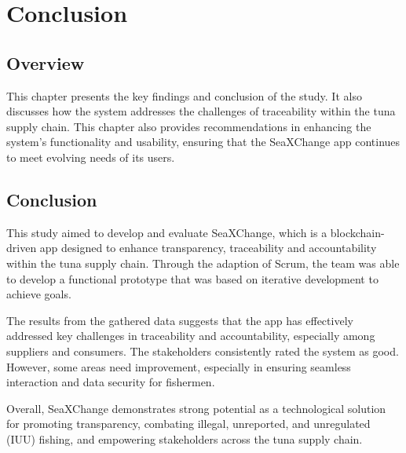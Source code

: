 \chapter{Conclusion}
\vspace*{-1cm}  %
\section{Overview}
This chapter  presents the key findings and conclusion of the study. It also discusses how the system addresses the challenges of traceability within the tuna supply chain. This chapter also provides recommendations in enhancing the system's functionality and usability, ensuring that the SeaXChange app continues to meet evolving needs of its users. 


\section{Conclusion}
This study aimed to develop and evaluate SeaXChange, which is a blockchain-driven app designed to enhance transparency, traceability and accountability within the tuna supply chain. Through the adaption of Scrum, the team was able to develop a functional prototype that was based on iterative development to achieve goals. 

\noindent The results from the gathered data suggests that the app has effectively addressed key challenges in traceability and accountability, especially among suppliers and consumers. The stakeholders consistently rated the system as good. However, some areas need improvement, especially in ensuring seamless interaction and data security for fishermen.

\noindent Overall, SeaXChange demonstrates strong potential as a technological solution for promoting transparency, combating illegal, unreported, and unregulated (IUU) fishing, and empowering stakeholders across the tuna supply chain.

